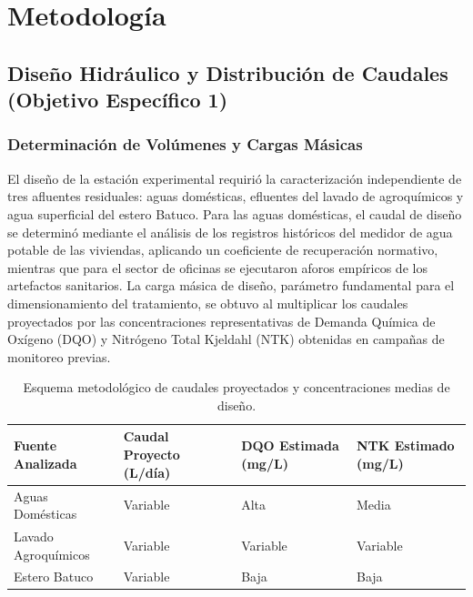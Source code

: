 \documentclass[12pt, letterpaper]{report}
\begin{document}
\chapter{Metodología}

\section{Diseño Hidráulico y Distribución de Caudales (Objetivo Específico 1)}

\subsection{Determinación de Volúmenes y Cargas Másicas}
El diseño de la estación experimental requirió la caracterización independiente de tres afluentes residuales: aguas domésticas, efluentes del lavado de agroquímicos y agua superficial del estero Batuco. Para las aguas domésticas, el caudal de diseño se determinó mediante el análisis de los registros históricos del medidor de agua potable de las viviendas, aplicando un coeficiente de recuperación normativo, mientras que para el sector de oficinas se ejecutaron aforos empíricos de los artefactos sanitarios. La carga másica de diseño, parámetro fundamental para el dimensionamiento del tratamiento, se obtuvo al multiplicar los caudales proyectados por las concentraciones representativas de Demanda Química de Oxígeno (DQO) y Nitrógeno Total Kjeldahl (NTK) obtenidas en campañas de monitoreo previas.

\begin{table}[H]
    \centering
    \caption{Esquema metodológico de caudales proyectados y concentraciones medias de diseño.}
    \vspace{0.2cm}
    \label{tab:caracterizacion_afluentes}
    \begin{tabular}{|>{\raggedright\arraybackslash}p{4cm}|>{\centering\arraybackslash}p{3.3cm}|>{\centering\arraybackslash}p{3.3cm}|>{\centering\arraybackslash}p{3.3cm}|}
        \hline
        \textbf{Fuente Analizada} & \textbf{Caudal Proyecto (L/día)} & \textbf{DQO Estimada (mg/L)} & \textbf{NTK Estimado (mg/L)} \\
        \hline
        Aguas Domésticas & Variable & Alta & Media \\
        Lavado Agroquímicos & Variable & Variable & Variable \\
        Estero Batuco & Variable & Baja & Baja \\
        \hline
    \end{tabular}
\end{table}
\end{document}
